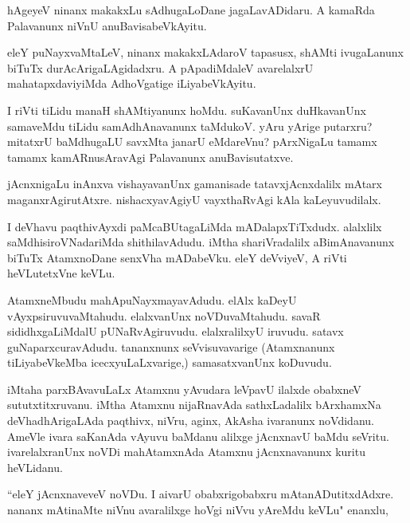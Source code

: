 \documentclass{article}
\begin{document}
\begin{mn}
hAgeyeV ninanx makakxLu sAdhugaLoDane jagaLavADidaru.  A kamaRda Palavanunx
 niVnU anuBavisabeVkAyitu.
\end{mn}

\begin{mn}
eleY puNayxvaMtaLeV,  ninanx makakxLAdaroV tapasusx,  shAMti ivugaLanunx 
 biTuTx durAcArigaLAgidadxru. A pApadiMdaleV avarelalxrU mahatapxdaviyiMda
 AdhoVgatige iLiyabeVkAyitu.
\end{mn}

\begin{mn}
I riVti tiLidu manaH shAMtiyanunx hoMdu.  suKavanUnx duHkavanUnx  samaveMdu
 tiLidu samAdhAnavanunx taMdukoV. yAru yArige putarxru?  mitatxrU baMdhugaLU
 savxMta janarU eMdareVnu? pArxNigaLu tamamx tamamx kamARnusAravAgi Palavanunx 
 anuBavisutatxve.
\end{mn}

\begin{mn}
jAcnxnigaLu inAnxva  vishayavanUnx gamanisade tatavxjAcnxdalilx mAtarx 
 maganxrAgirutAtxre. nishacxyavAgiyU vayxthaRvAgi kAla kaLeyuvudilalx. 
\end{mn}

\begin{mn}
I deVhavu paqthivAyxdi paMcaBUtagaLiMda  mADalapxTiTxdudx. alalxlilx 
saMdhisiroVNadariMda shithilavAdudu. iMtha shariVradalilx aBimAnavanunx
 biTuTx AtamxnoDane senxVha mADabeVku.  eleY deVviyeV, A riVti heVLutetxVne keVLu.
\end{mn}

\begin{mn}
AtamxneMbudu mahApuNayxmayavAdudu. elAlx kaDeyU vAyxpsiruvuvaMtahudu. 
elalxvanUnx noVDuvaMtahudu. savaR sididhxgaLiMdalU  pUNaRvAgiruvudu.
 elalxralilxyU iruvudu. satavx guNaparxcuravAdudu. tananxnunx seVvisuvavarige
 (Atamxnanunx tiLiyabeVkeMba icecxyuLaLxvarige,) samasatxvanUnx koDuvudu.
\end{mn}

\begin{mn}
iMtaha parxBAvavuLaLx Atamxnu yAvudara leVpavU ilalxde obabxneV sututxtitxruvanu.
iMtha Atamxnu nijaRnavAda sathxLadalilx bArxhamxNa deVhadhArigaLAda paqthivx,
 niVru, aginx, AkAsha ivaranunx noVdidanu. AmeVle ivara saKanAda vAyuvu baMdanu 
 alilxge jAcnxnavU baMdu seVritu.  ivarelalxranUnx noVDi mahAtamxnAda Atamxnu 
 jAcnxnavanunx kuritu heVLidanu.
\end{mn}

\begin{mn}
``eleY jAcnxnaveveV noVDu.  I aivarU obabxrigobabxru mAtanADutitxdAdxre.
 nananx mAtinaMte niVnu  avaralilxge hoVgi niVvu yAreMdu keVLu" enanxlu, 
\end{mn}
\end{document}
